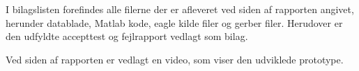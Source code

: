 I bilagslisten forefindes alle filerne der er afleveret ved siden af rapporten angivet, herunder datablade, Matlab kode, eagle kilde filer og gerber filer. Herudover er den udfyldte accepttest og fejlrapport vedlagt som bilag.

Ved siden af rapporten er vedlagt en video, som viser den udviklede prototype.

